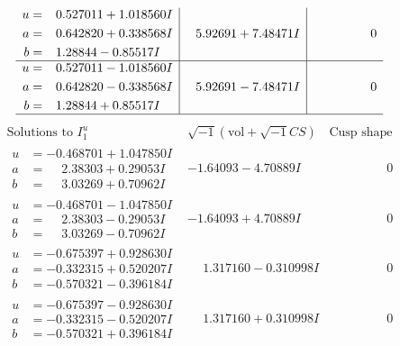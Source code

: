 \documentclass[1p]{elsarticle_modified}
\theoremstyle{definition}
\newcommand{\I}{\sqrt{-1}}
\begin{document}
$$\begin{array}{c|c|c}
\begin{aligned}
u &= \phantom{-}0.527011 + 1.018560 I \\
a &= \phantom{-}0.642820 + 0.338568 I \\
b &= \phantom{-}1.28844 - 0.85517 I\end{aligned}
 & \phantom{-}5.92691 + 7.48471 I & \phantom{-0.000000 } 0 \\ \hline\begin{aligned}
u &= \phantom{-}0.527011 - 1.018560 I \\
a &= \phantom{-}0.642820 - 0.338568 I \\
b &= \phantom{-}1.28844 + 0.85517 I\end{aligned}
 & \phantom{-}5.92691 - 7.48471 I & \phantom{-0.000000 } 0\\
 \hline 
 \end{array}$$\newpage$$\begin{array}{c|c|c}  
\text{Solutions to }I^u_{1}& \I (\text{vol} + \sqrt{-1}CS) & \text{Cusp shape}\\
 \hline 
\begin{aligned}
u &= -0.468701 + 1.047850 I \\
a &= \phantom{-}2.38303 + 0.29053 I \\
b &= \phantom{-}3.03269 + 0.70962 I\end{aligned}
 & -1.64093 - 4.70889 I & \phantom{-0.000000 } 0 \\ \hline\begin{aligned}
u &= -0.468701 - 1.047850 I \\
a &= \phantom{-}2.38303 - 0.29053 I \\
b &= \phantom{-}3.03269 - 0.70962 I\end{aligned}
 & -1.64093 + 4.70889 I & \phantom{-0.000000 } 0 \\ \hline\begin{aligned}
u &= -0.675397 + 0.928630 I \\
a &= -0.332315 + 0.520207 I \\
b &= -0.570321 - 0.396184 I\end{aligned}
 & \phantom{-}1.317160 - 0.310998 I & \phantom{-0.000000 } 0 \\ \hline\begin{aligned}
u &= -0.675397 - 0.928630 I \\
a &= -0.332315 - 0.520207 I \\
b &= -0.570321 + 0.396184 I\end{aligned}
 & \phantom{-}1.317160 + 0.310998 I & \phantom{-0.000000 } 0 \\ \hline\begin{aligned}

\end{aligned}
\end{array}$$
\end{document}
